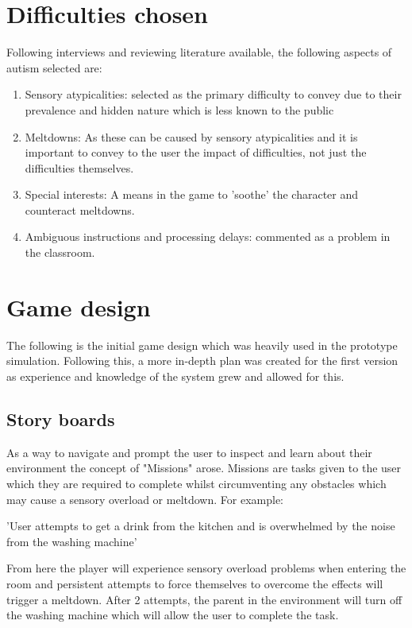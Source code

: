 \documentclass[11pt]{report}
\begin{document}
\section{Difficulties chosen}
Following interviews and reviewing literature available, the following aspects of autism selected are:

\begin{enumerate}
\item Sensory atypicalities: selected as the primary difficulty to convey due to their prevalence and hidden nature which is less known to the public
\item Meltdowns: As these can be caused by sensory atypicalities and it is important to convey to the user the impact of difficulties, not just the difficulties themselves.
\item Special interests: A means in the game to 'soothe' the character and counteract meltdowns.
\item Ambiguous instructions and processing delays: commented as a problem in the classroom.
\end{enumerate}

\section{Game design}
The following is the initial game design which was heavily used in the prototype simulation. Following this, a more in-depth plan was created for the first version as experience and knowledge of the system grew and allowed for this.

\subsection{Story boards}
As a way to navigate and prompt the user to inspect and learn about their environment the concept of "Missions" arose. Missions are tasks given to the user which they are required to complete whilst circumventing any obstacles which may cause a sensory overload or meltdown. For example:

'User attempts to get a drink from the kitchen and is overwhelmed by the noise from the washing machine'

From here the player will experience sensory overload problems when entering the room and persistent attempts to force themselves to overcome the effects will trigger a meltdown. After 2 attempts, the parent in the environment will turn off the washing machine which will allow the user to complete the task.
\end{document}
